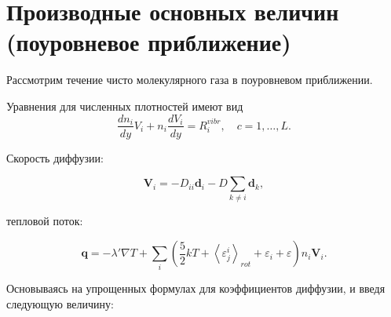 \documentclass[12pt]{article}
\begin{document}

\section{Производные основных величин (поуровневое приближение)}
Рассмотрим течение чисто молекулярного газа в поуровневом приближении.

Уравнения для численных плотностей имеют вид
\begin{equation}
  \frac{d n_{i}}{d y} V_{i} + n_{i}\frac{d V_{i}}{d y} = R_{i}^{vibr},\quad c=1,\ldots,L.\label{densityeqn-sts}
\end{equation}

Скорость диффузии:




\begin{equation}
   \mathbf{V}_{i} = -D_{ii}\mathbf{d}_{i} -D \sum_{k \neq i}\mathbf{d}_{k},
\end{equation}

тепловой поток:

\begin{equation}
  \mathbf{q} = -\lambda' \nabla T + \sum_{i} \left(\frac{5}{2}kT + \left<\varepsilon^{i}_{j} \right>_{rot} + \varepsilon_{i} + \varepsilon \right) n_{i} \mathbf{V}_{i}.
\end{equation}

Основываясь на упрощенных формулах для коэффициентов диффузии, и введя следующую величину:
\end{document}
